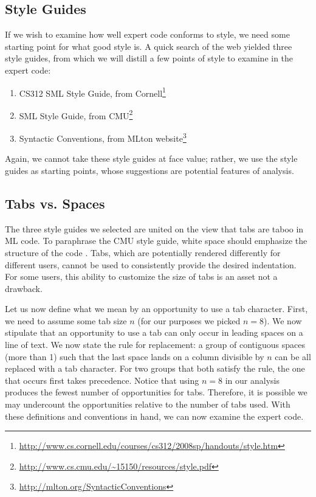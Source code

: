 \documentclass[12pt,abstracton]{scrartcl}
\begin{document}
\subsection{Style Guides}\label{subsec:guide}
If we wish to examine how well expert code conforms to style, we need some starting point for
what good style is. A quick search of the web yielded three style guides, from which
we will distill a few points of style to examine in the expert code:
\begin{enumerate}
\item CS312 SML Style Guide, from Cornell\footnote{\url{http://www.cs.cornell.edu/courses/cs312/2008sp/handouts/style.htm}}
\item SML Style Guide, from CMU\footnote{\url{http://www.cs.cmu.edu/~15150/resources/style.pdf}}
\item Syntactic Conventions, from MLton website\footnote{\url{http://mlton.org/SyntacticConventions}}
\end{enumerate}

Again, we cannot take these style guides at face value; rather, we use
the style guides as starting points, whose suggestions are potential
features of analysis.
\subsection{Tabs vs. Spaces}\label{subsec:tab}
The three style guides we selected are
united on the view that tabs are taboo in ML code. To paraphrase the CMU
style guide, white space should emphasize the structure of the code \cite{Cmu12}.
Tabs, which are potentially rendered differently for
different users, cannot be used to consistently provide the desired indentation.
For some users, this ability to customize the size of tabs is an asset not
a drawback.

Let us now define what we mean by an opportunity to use a tab character.
First, we need to assume some tab size $n$ (for our purposes we picked $n=8$).
We now stipulate that an opportunity to use a tab can only
occur in leading spaces on a line of text. We now state the rule for replacement:
a group of contiguous spaces (more than 1) such that the last space lands
on a column divisible by $n$ can be all replaced with a tab character.
For two groups that both satisfy the rule, the one that occurs first takes precedence.
Notice that using $n = 8$ in our analysis produces the fewest number of
opportunities for tabs. Therefore, it is possible we may undercount the opportunities
relative to the number of tabs used.
With these definitions and conventions in hand,
we can now examine the expert code.
\end{document}
